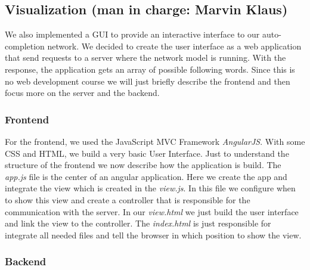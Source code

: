 \documentclass[11pt,a4paper,bibliography=totocnumbered,listof=totocnumbered]{scrartcl}
\begin{document}
\subsection{Visualization \small{(man in charge: Marvin Klaus)}} \label{sec:vis}
We also implemented a GUI to provide an interactive interface to our auto-completion network. We decided to create the user interface as a web application that send requests to a server where the network model is running. With the response, the application gets an array of possible following words. Since this is no web development course we will just briefly describe the frontend and then focus more on the server and the backend.

\subsubsection{Frontend}

For the frontend, we used the JavaScript MVC Framework \textit{AngularJS}. With some CSS and HTML, we build a very basic User Interface. Just to understand the structure of the frontend we now describe how the application is build. The \textit{app.js} file is the center of an angular application. Here we create the app and integrate the view which is created in the \textit{view.js}. In this file we configure when to show this view and create a controller that is responsible for the communication with the server. In our \textit{view.html} we just build the user interface and link the view to the controller. The \textit{index.html} is just responsible for integrate all needed files and tell the browser in which position to show the view.

\subsubsection{Backend}
\end{document}
